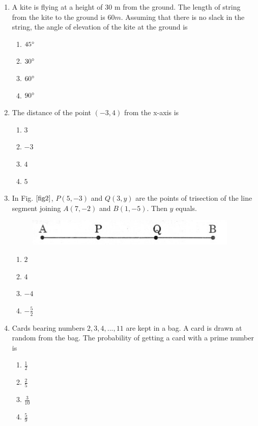 \documentclass[journal,12pt,twocolumn]{IEEEtran}
\renewcommand\thesection{\arabic{section}}
\begin{document}
\begin{enumerate}[label=\thesection.\arabic*.,ref=\thesection.\theenumi]
\item A kite is flying at a height of 30 m from the ground. The length of string from the kite to the ground is $60 m$. Assuming that there is no slack in the string, the angle of elevation of the kite at the ground is
\begin{enumerate}
    \item $45\degree$\\
    \item $30\degree$\\
    \item $60\degree$\\
    \item $90\degree$\\
 \end{enumerate}
\item The distance of the point $(-3 , 4)$ from the x-axis is
 \begin{enumerate}
    \item $3$\\
    \item $-3$\\
    \item $4$\\
    \item $5$ \\
 \end{enumerate}
\item In Fig. $\ref{fig2}$, $P(5, -3)$ and $Q(3, y)$ are the points of trisection of the line segment joining $A(7, -2)$ and $B(1, -5)$. Then $y$ equals.\\
\begin{figure}[h!]
    \centering
    \includegraphics[width=0.5\columnwidth,center]{2.png}
    \caption{}
    \label{fig2}
 \end{figure}
 \begin{enumerate}
  \item $2$\\
  \item $4$ \\
  \item $-4$ \\
  \item $-\frac{5}{2}$
\end{enumerate}
\item Cards bearing numbers $2,3,4, ..., 11$ are kept in a bag. A card is drawn at random from the bag. The probability of getting a card with a prime number is\\
 \begin{enumerate}
     \item $\frac{1}{2}$\\
     \item $\frac{2}{5}$\\
     \item $\frac{3}{10}$\\
     \item $\frac{5}{9}$\\
 \end{enumerate}
\end{enumerate}
\end{document}

